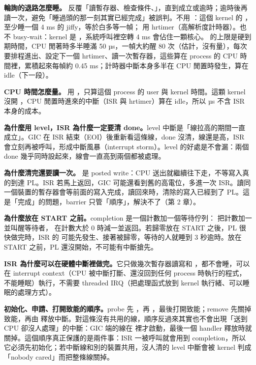 \textbf{輪詢的退路怎麼睡。} 反覆「讀暫存器、檢查條件、」，直到成立或逾時；逾時後再讀一次，避免「睡過頭的那一刻其實已經完成」被誤判。不用 ：這個 kernel 的 ， 至少睡一個 4 ms 的 jiffy，等於白多等一幀； 用 hrtimer（高解析度計時器）。也不 busy-wait：kernel 是 ，系統呼叫裡空轉 4 ms 會佔住一顆核心。 的上限是硬到期時間，CPU 閒著時多半睡滿 50 µs，一幀大約醒 80 次（估計，沒有量），每次要排程進出、設定下一個 hrtimer、讀一次暫存器，這些算在 process 的 CPU 時間裡，累積起來每幀約 0.45 ms；計時器中斷本身多半在 CPU 閒置時發生，算在 idle（下一段）。

\textbf{CPU 時間怎麼量。} 用 ，只算這個 process 的 user 與 kernel 時間。這顆 kernel 沒開 ，CPU 閒置時進來的中斷（ISR 與 hrtimer）算在 idle，所以 \irqCpuUs{} µs 不含 ISR 本身的成本。

\textbf{為什麼用 level，ISR 為什麼一定要清 done。}level 中斷是「線拉高的期間一直成立」。GIC 在 ISR 結束（EOI）後重新看這條線，done 沒清，線還是高，ISR 會立刻再被呼叫，形成中斷風暴（interrupt storm）。level 的好處是不會漏：兩個 done 幾乎同時設起來，線會一直高到兩個都被處理。

\textbf{為什麼清完還要讀一次。} 是 posted write：CPU 送出就繼續往下走，不等寫入真的到達 PL。ISR 若馬上返回，GIC 可能還看到舊的高電位，多進一次 ISR。讀同一個裝置的暫存器會等前面的寫入完成，讀回來時，清除的寫入已經到了 PL。這是「完成」的問題，barrier 只管「順序」，解決不了（第 2 章）。

\textbf{ 為什麼放在 START 之前。}completion 是一個計數加一個等待佇列： 把計數加一並叫醒等待者， 在計數大於 0 時減一並返回。若歸零放在 START 之後，PL 很快做完時，ISR 的  可能先發生、接著被歸零，等待的人就睡到 3 秒逾時。放在 START 之前，PL 還沒開始，不可能有中斷搶先。

\textbf{ISR 為什麼可以在硬體中斷裡做完。}它只做幾次暫存器讀寫和 ，都不會睡，可以在 interrupt context（CPU 被中斷打斷、還沒回到任何 process 時執行的程式，不能睡眠）執行，不需要 threaded IRQ（把處理函式放到 kernel 執行緒、可以睡眠的處理方式）。

\textbf{初始化、申請、打開致能的順序。}probe 先 ，再 ，最後打開致能；remove 先關掉致能，再由  釋放中斷。對這條沒有共用的線，順序反過來其實也不會出現「送到 CPU 卻沒人處理」的中斷：GIC 端的線在  裡才啟動，最後一個 handler 釋放時就關掉。這個順序真正保護的是兩件事：ISR 一被呼叫就會用到 completion，所以它必須先初始化；若中斷線和別的裝置共用，沒人清的 level 中斷會被 kernel 判成「nobody cared」而把整條線關掉。

